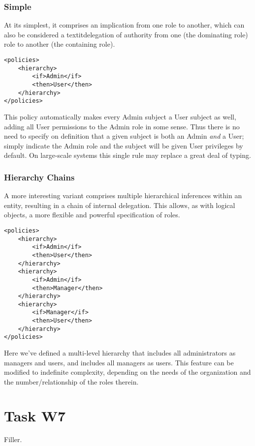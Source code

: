 \documentclass{article}
\begin{document}
\subsubsection{Simple}
At its simplest, it comprises an implication from one role to another, which can also be considered a textit{delegation} of authority from one (the dominating role) role to another (the containing role).
\begin{lstlisting}
<policies>
    <hierarchy>
        <if>Admin</if>
        <then>User</then>
    </hierarchy>
</policies>
\end{lstlisting}
This policy automatically makes every Admin subject a User subject as well, adding all User permissions to the Admin role in some sense. Thus there is no need to specify on definition that a given subject is both an Admin \textit{and} a User; simply indicate the Admin role and the subject will be given User privileges by default. On large-scale systems this single rule may replace a great deal of typing.

\subsubsection{Hierarchy Chains}
A more interesting variant comprises multiple hierarchical inferences within an entity, resulting in a chain of internal delegation. This allows, as with logical objects, a more flexible and powerful specification of roles.
\begin{lstlisting}
<policies>
    <hierarchy>
        <if>Admin</if>
        <then>User</then>
    </hierarchy>
    <hierarchy>
        <if>Admin</if>
        <then>Manager</then>
    </hierarchy>
    <hierarchy>
        <if>Manager</if>
        <then>User</then>
    </hierarchy>
</policies>
\end{lstlisting}
Here we've defined a multi-level hierarchy that includes all administrators as managers and users, and includes all managers as users.
This feature can be modified to indefinite complexity, depending on the needs of the organization and the number/relationship of the roles therein. \\

\section{Task W7}
Filler.

\pagebreak

\printbibliography[heading=bibintoc]
\end{document}
